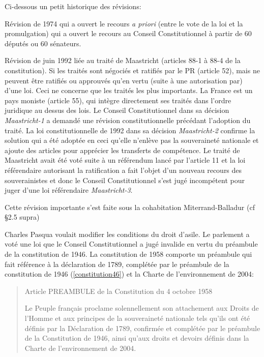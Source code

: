 \documentclass[math]{cours}
\begin{document}
Ci-dessous un petit historique des révisions:
\begin{description}
	\item Révision de 1974 qui a ouvert le recours \emph{a priori} (entre le vote de la loi et la promulgation) qui a ouvert le recours au Conseil Constitutionnel à partir de 60 députés ou 60 sénateurs.
	\item Révision de juin 1992 liée au traité de Maastricht (articles 88-1 à 88-4 de la constitution).
	      Si les traités sont négociés et ratifiés par le PR (article 52), mais ne peuvent être ratifiés ou approuvés qu'en vertu (suite à une autorisation par) d'une loi. Ceci ne concerne que les traités les plus importants.
	      La France est un pays moniste (article 55), qui intègre directement ses traités dans l'ordre juridique au dessus des lois.
	      Le Conseil Constitutionnel dans sa décision \emph{Maastricht-1} a demandé une révision constitutionnelle précédant l'adoption du traité.
	      La loi constitutionnelle de 1992 dans sa décision \emph{Maastricht-2} confirme la solution qui a été adoptée en ceci qu'elle n'enlève pas la souveraineté nationale et ajoute des articles pour apprécier les transferts de compétence.
	      Le traité de Maastricht avait été voté suite à un référendum lancé par l'article 11 et la loi référendaire autorisant la ratification a fait l'objet d'un nouveau recours des souverainistes et donc le Conseil Constitutionnel s'est jugé incompétent pour juger d'une loi référendaire \emph{Maastricht-3}.
	\item[Révision de juillet 1993 sur le CSM et la Cour de justice de la République] Cette révision importante s'est faite sous la cohabitation Miterrand-Balladur (cf §2.5 supra)
	\item[Révision de novembre 1993 sur le droit d'asile (\emph{validation constitutionelle})]
	      Charles Pasqua voulait modifier les conditions du droit d'asile.
	      Le parlement a voté une loi que le Conseil Constitutionnel a jugé invalide en vertu du préambule de la constitution de 1946.
	      La constitution de 1958 comporte un préambule qui fait référence à la déclaration de 1789, complétée par le préambule de la constitution de 1946 (\ref{constitution46}) et la Charte de l'environnement de 2004:
	      \begin{quote}
		      \begin{center}
			      Article PREAMBULE de la Constitution du 4 octobre 1958
		      \end{center}
		      Le Peuple français proclame solennellement son attachement aux Droits de l'Homme et aux principes de la souveraineté nationale tels qu'ils ont été définis par la Déclaration de 1789, confirmée et complétée par le préambule de la Constitution de 1946, ainsi qu'aux droits et devoirs définis dans la Charte de l'environnement de 2004.


\end{quote}
\end{description}
\end{document}

